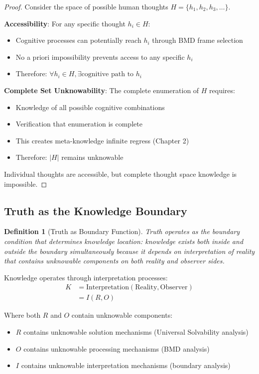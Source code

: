 \documentclass[12pt,a4paper]{article}
\newtheorem{definition}[theorem]{Definition}
\begin{document}
\begin{proof}
Consider the space of possible human thoughts $H = \{h_1, h_2, h_3, \ldots\}$.

\textbf{Accessibility}: For any specific thought $h_i \in H$:
\begin{itemize}
\item Cognitive processes can potentially reach $h_i$ through BMD frame selection
\item No a priori impossibility prevents access to any specific $h_i$
\item Therefore: $\forall h_i \in H, \exists \text{cognitive path to } h_i$
\end{itemize}

\textbf{Complete Set Unknowability}: The complete enumeration of $H$ requires:
\begin{itemize}
\item Knowledge of all possible cognitive combinations
\item Verification that enumeration is complete
\item This creates meta-knowledge infinite regress (Chapter 2)
\item Therefore: $|H|$ remains unknowable
\end{itemize}

Individual thoughts are accessible, but complete thought space knowledge is impossible.
\end{proof}

\subsection{Truth as the Knowledge Boundary}

\begin{definition}[Truth as Boundary Function]
Truth operates as the boundary condition that determines knowledge location: knowledge exists both inside and outside the boundary simultaneously because it depends on interpretation of reality that contains unknowable components on both reality and observer sides.
\end{definition}

Knowledge operates through interpretation processes:
\begin{align}
K &= \text{Interpretation}(\text{Reality}, \text{Observer}) \\
&= I(R, O)
\end{align}

Where both $R$ and $O$ contain unknowable components:
\begin{itemize}
\item $R$ contains unknowable solution mechanisms (Universal Solvability analysis)
\item $O$ contains unknowable processing mechanisms (BMD analysis)
\item $I$ contains unknowable interpretation mechanisms (boundary analysis)
\end{itemize}
\end{document}
